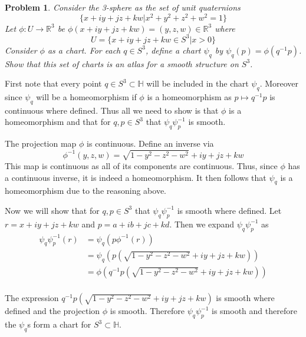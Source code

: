 \documentclass[10pt]{article}
\newcommand{\sk}{\vskip 10mm}
\newcommand{\bb}[1]{\mathbb{#1}}
\theoremstyle{plain}
\newtheorem{problem}{Problem}
\theoremstyle{remark}
\begin{document}
\begin{problem}
  Consider the 3-sphere as the set of unit quaternions
  \[ \{x+iy+jz+kw|x^2+y^2+z^2+w^2=1\} \]
  Let $\phi:U\rightarrow\bb{R}^3$ be $\phi(x+iy+jz+kw)=(y,z,w)\in\bb{R}^3$ where
  \[ U=\{x+iy+jz+kw\in S^3|x>0\} \]
  Consider $\phi$ as a chart. For each $q\in S^3$, define a chart $\psi_q$ by
  $\psi_q(p)=\phi(q^{-1}p)$. Show that this set of charts is an atlas for a
  smooth structure on $S^3$.
\end{problem}

First note that every point $q\in S^3\subset\bb{H}$ will be included
in the chart $\psi_q$. Moreover since $\psi_q$ will be a homeomorphism
if $\phi$ is a homeomorphism as $p\mapsto q^{-1}p$ is continuous where defined.
Thus all we need to show is that $\phi$ is 
a homeomorphism and that for $q,p\in S^3$ that $\psi_q\psi_p^{-1}$ is smooth.

The projection map $\phi$ is continuous. Define an inverse via
\[ \phi^{-1}(y,z,w)=\sqrt{1-y^2-z^2-w^2}+iy+jz+kw \]
This map is continuous as all of its components are continuous. Thus,
since $\phi$ has a continuous inverse, it is indeed a homeomorphism.
It then follows that $\psi_q$ is a homeomorphism due to the reasoning above.

Now we will show that for $q,p\in S^3$ that $\psi_q\psi_p^{-1}$ is smooth where
defined. Let $r=x+iy+jz+kw$ and $p=a+ib+jc+kd$.
Then we expand $\psi_q\psi_p^{-1}$ as
\begin{align*}
  \psi_q\psi_p^{-1}(r)&=\psi_q(p\phi^{-1}(r))\\
                &= \psi_q(p(\sqrt{1-y^2-z^2-w^2}+iy+jz+kw))\\
                &= \phi(q^{-1}p(\sqrt{1-y^2-z^2-w^2}+iy+jz+kw))\\
\end{align*}

The expression $q^{-1}p(\sqrt{1-y^2-z^2-w^2}+iy+jz+kw)$ is smooth where defined
and the projection $\phi$ is smooth. Therefore $\psi_q\psi_p^{-1}$ is smooth and
therefore the $\psi_q$s form a chart for $S^3\subset\bb{H}$.

\sk
\end{document}
